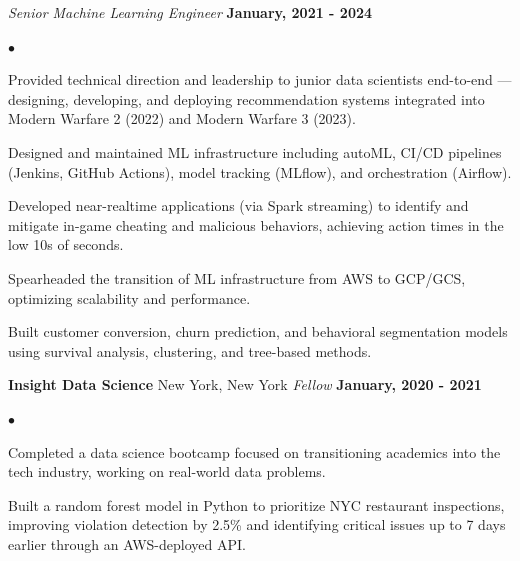 \documentclass[margin,line, 11pt]{res}
\newenvironment{list2}{
  \begin{list}{$\bullet$}{%
      \setlength{\itemsep}{0in}
      \setlength{\parsep}{0in} \setlength{\parskip}{0in}
      \setlength{\topsep}{0in} \setlength{\partopsep}{0in}
      \setlength{\leftmargin}{0.2in}}}{\end{list}}
\begin{document}
\begin{resume}
\textit{Senior Machine Learning Engineer} \hfill \textbf{January, 2021 - 2024}\newline
    \begin{list2}
        \vspace*{-5mm}
        \item Provided technical direction and leadership to junior data scientists end-to-end — designing, developing, and deploying recommendation systems integrated into Modern Warfare 2 (2022) and Modern Warfare 3 (2023).
        \item Designed and maintained ML infrastructure including autoML, CI/CD pipelines (Jenkins, GitHub Actions), model tracking (MLflow), and orchestration (Airflow).
        \item Developed near-realtime applications (via Spark streaming) to identify and mitigate in-game cheating and malicious behaviors, achieving action times in the low 10s of seconds.
        \item Spearheaded the transition of ML infrastructure from AWS to GCP/GCS, optimizing scalability and performance.
        \item Built customer conversion, churn prediction, and behavioral segmentation models using survival analysis, clustering, and tree-based methods.    
    \end{list2}
\vspace*{-2mm}
\textbf{Insight Data Science} \hfill New York, New York\newline
\textit{Fellow} \hfill \textbf{January, 2020 - 2021}\newline
    \begin{list2}
    	\vspace*{-5mm}
        \item Completed a data science bootcamp focused on transitioning academics into the tech industry, working on real-world data problems.
        \item Built a random forest model in Python to prioritize NYC restaurant inspections, improving violation detection by 2.5\% and identifying critical issues up to 7 days earlier through an AWS-deployed API.
    \end{list2}
\vspace*{-2mm}


\end{resume}
\end{document}
